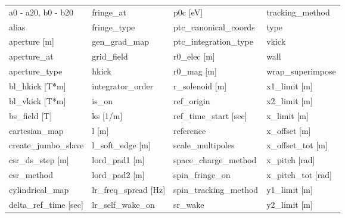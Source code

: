  \begin{tabular}{llll} \toprule
a0 - a20, b0 - b20               & fringe_at                        & p0c [eV]                         & tracking_method                  \\
alias                            & fringe_type                      & ptc_canonical_coords             & type                             \\
aperture [m]                     & gen_grad_map                     & ptc_integration_type             & vkick                            \\
aperture_at                      & grid_field                       & r0_elec [m]                      & wall                             \\
aperture_type                    & hkick                            & r0_mag [m]                       & wrap_superimpose                 \\
bl_hkick [T*m]                   & integrator_order                 & r_solenoid [m]                   & x1_limit [m]                     \\
bl_vkick [T*m]                   & is_on                            & ref_origin                       & x2_limit [m]                     \\
bs_field [T]                     & ks [1/m]                         & ref_time_start [sec]             & x_limit [m]                      \\
cartesian_map                    & l [m]                            & reference                        & x_offset [m]                     \\
create_jumbo_slave               & l_soft_edge [m]                  & scale_multipoles                 & x_offset_tot [m]                 \\
csr_ds_step [m]                  & lord_pad1 [m]                    & space_charge_method              & x_pitch [rad]                    \\
csr_method                       & lord_pad2 [m]                    & spin_fringe_on                   & x_pitch_tot [rad]                \\
cylindrical_map                  & lr_freq_spread [Hz]              & spin_tracking_method             & y1_limit [m]                     \\
delta_ref_time [sec]             & lr_self_wake_on                  & sr_wake                          & y2_limit [m]                     \\

\end{tabular}
